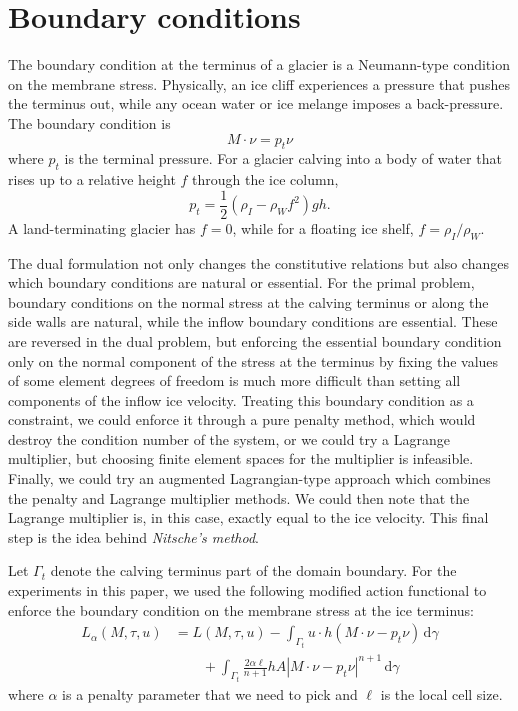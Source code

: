 \documentclass{article}
\theoremstyle{definition}
\theoremstyle{plain}
\newcommand{\ud}{\hspace{2pt}\mathrm{d}}
\begin{document}
\appendix

\section{Boundary conditions} \label{sec:boundary-conditions}

The boundary condition at the terminus of a glacier is a Neumann-type condition on the membrane stress.
Physically, an ice cliff experiences a pressure that pushes the terminus out, while any ocean water or ice melange imposes a back-pressure.
The boundary condition is
\begin{equation}
    M\cdot\nu = p_t\nu
\end{equation}
where $p_t$ is the terminal pressure.
For a glacier calving into a body of water that rises up to a relative height $f$ through the ice column,
\begin{equation}
    p_t = \frac{1}{2}\left(\rho_I - \rho_Wf^2\right)gh.
\end{equation}
A land-terminating glacier has $f = 0$, while for a floating ice shelf, $f = \rho_I / \rho_W$.

The dual formulation not only changes the constitutive relations but also changes which boundary conditions are natural or essential.
For the primal problem, boundary conditions on the normal stress at the calving terminus or along the side walls are natural, while the inflow boundary conditions are essential.
These are reversed in the dual problem, but enforcing the essential boundary condition only on the normal component of the stress at the terminus by fixing the values of some element degrees of freedom is much more difficult than setting all components of the inflow ice velocity.
Treating this boundary condition as a constraint, we could enforce it through a pure penalty method, which would destroy the condition number of the system, or we could try a Lagrange multiplier, but choosing finite element spaces for the multiplier is infeasible.
Finally, we could try an augmented Lagrangian-type approach which combines the penalty and Lagrange multiplier methods.
We could then note that the Lagrange multiplier is, in this case, exactly equal to the ice velocity.
This final step is the idea behind \emph{Nitsche's method}.

Let $\Gamma_t$ denote the calving terminus part of the domain boundary.
For the experiments in this paper, we used the following modified action functional to enforce the boundary condition on the membrane stress at the ice terminus:
\begin{align}
    L_\alpha(M, \tau, u) & = L(M, \tau, u) - \int_{\Gamma_t}u\cdot h\left(M\cdot\nu - p_t\nu\right)\ud\gamma \nonumber\\
    & \qquad + \int_{\Gamma_t}\frac{2\alpha\ell}{n + 1}hA\left|M\cdot\nu - p_t\nu\right|^{n + 1}\ud\gamma
    \label{eq:nitsche-functional}
\end{align}
where $\alpha$ is a penalty parameter that we need to pick and $\ell$ is the local cell size.
\end{document}
